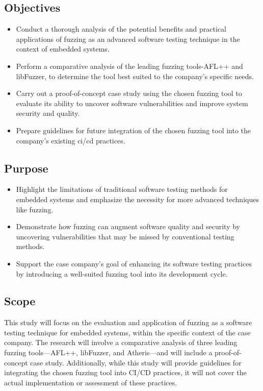 \subsection{Objectives}
\begin{itemize}
\item Conduct a thorough analysis of the potential benefits and practical
      applications of fuzzing as an advanced software testing technique in the context of embedded systems.
\item Perform a comparative analysis of the leading fuzzing tools-AFL++ and libFuzzer,
      to determine the tool best suited to the company's specific needs.
\item Carry out a proof-of-concept case study using the chosen fuzzing tool to
      evaluate its ability to uncover software vulnerabilities and improve system security and quality.
\item Prepare guidelines for future integration of the chosen fuzzing tool
     into the company's existing \acrshort{ci/cd} practices.
\end{itemize}

\subsection{Purpose}
\begin{itemize}
\item Highlight the limitations of traditional software testing methods for
      embedded systems and emphasize the necessity for more advanced techniques like fuzzing.
\item Demonstrate how fuzzing can augment software quality and security by
      uncovering vulnerabilities that may be missed by conventional testing methods.
\item Support the case company's goal of enhancing its software testing practices by
      introducing a well-suited fuzzing tool into its development cycle.
\end{itemize}
\subsection{Scope}
This study will focus on the evaluation and application of fuzzing as a software
testing technique for embedded systems, within the specific context of the
case company. The research will involve a comparative analysis of three leading
fuzzing tools—AFL++, libFuzzer, and Atheris—and will include a proof-of-concept
case study. Additionally, while this study will provide guidelines for
integrating the chosen fuzzing tool into CI/CD practices,
it will not cover the actual implementation or assessment of these practices.
\clearpage

